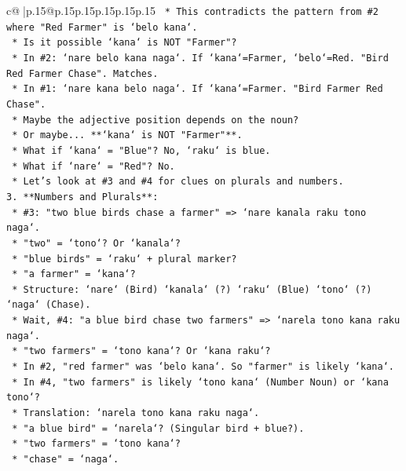 \documentclass{article}
\begin{document}
{\begin{supertabular}{c@{$\;$}|p{.15\linewidth}@{}p{.15\linewidth}p{.15\linewidth}p{.15\linewidth}p{.15\linewidth}p{.15\linewidth}}
{{{\texttt{        *   This contradicts the pattern from \#2 where "Red Farmer" is `belo kana`.} \\
\texttt{        *   Is it possible `kana` is NOT "Farmer"?} \\
\texttt{            *   In \#2: `nare belo kana naga`. If `kana`=Farmer, `belo`=Red. "Bird Red Farmer Chase". Matches.} \\
\texttt{            *   In \#1: `nare kana belo naga`. If `kana`=Farmer. "Bird Farmer Red Chase".} \\
\texttt{            *   Maybe the adjective position depends on the noun?} \\
\texttt{            *   Or maybe... **`kana` is NOT "Farmer"**.} \\
\texttt{            *   What if `kana` = "Blue"? No, `raku` is blue.} \\
\texttt{            *   What if `nare` = "Red"? No.} \\
\texttt{            *   Let's look at \#3 and \#4 for clues on plurals and numbers.} \\
\texttt{3.  **Numbers and Plurals**:} \\
\texttt{    *   \#3: "two blue birds chase a farmer" => `nare kanala raku tono naga`.} \\
\texttt{        *   "two" = `tono`? Or `kanala`?} \\
\texttt{        *   "blue birds" = `raku` + plural marker?} \\
\texttt{        *   "a farmer" = `kana`?} \\
\texttt{        *   Structure: `nare` (Bird) `kanala` (?) `raku` (Blue) `tono` (?) `naga` (Chase).} \\
\texttt{        *   Wait, \#4: "a blue bird chase two farmers" => `narela tono kana raku naga`.} \\
\texttt{        *   "two farmers" = `tono kana`? Or `kana raku`?} \\
\texttt{        *   In \#2, "red farmer" was `belo kana`. So "farmer" is likely `kana`.} \\
\texttt{        *   In \#4, "two farmers" is likely `tono kana` (Number Noun) or `kana tono`?} \\
\texttt{        *   Translation: `narela tono kana raku naga`.} \\
\texttt{        *   "a blue bird" = `narela`? (Singular bird + blue?).} \\
\texttt{        *   "two farmers" = `tono kana`?} \\
\texttt{        *   "chase" = `naga`.} \\
}}}
\end{supertabular}}
\end{document}
